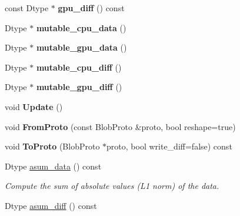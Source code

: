 \begin{DoxyCompactItemize}
\item 
const Dtype $\ast$ {\bfseries gpu\+\_\+diff} () const \hypertarget{classcaffe_1_1Blob_aafcc1d137ff67dea2d65824ce67bb21d}{}\label{classcaffe_1_1Blob_aafcc1d137ff67dea2d65824ce67bb21d}

\item 
Dtype $\ast$ {\bfseries mutable\+\_\+cpu\+\_\+data} ()\hypertarget{classcaffe_1_1Blob_ac170c040c34e2e78e7fc0d2ee12cf0ef}{}\label{classcaffe_1_1Blob_ac170c040c34e2e78e7fc0d2ee12cf0ef}

\item 
Dtype $\ast$ {\bfseries mutable\+\_\+gpu\+\_\+data} ()\hypertarget{classcaffe_1_1Blob_abac6bde0521e019df173213af6808e3b}{}\label{classcaffe_1_1Blob_abac6bde0521e019df173213af6808e3b}

\item 
Dtype $\ast$ {\bfseries mutable\+\_\+cpu\+\_\+diff} ()\hypertarget{classcaffe_1_1Blob_a4eb870499aa659a5eee7af622cd92eca}{}\label{classcaffe_1_1Blob_a4eb870499aa659a5eee7af622cd92eca}

\item 
Dtype $\ast$ {\bfseries mutable\+\_\+gpu\+\_\+diff} ()\hypertarget{classcaffe_1_1Blob_a8d230bed098a5ee31559df0b8e2db252}{}\label{classcaffe_1_1Blob_a8d230bed098a5ee31559df0b8e2db252}

\item 
void {\bfseries Update} ()\hypertarget{classcaffe_1_1Blob_afe035d7b60c56e4aed2a18296e8ffdc5}{}\label{classcaffe_1_1Blob_afe035d7b60c56e4aed2a18296e8ffdc5}

\item 
void {\bfseries From\+Proto} (const Blob\+Proto \&proto, bool reshape=true)\hypertarget{classcaffe_1_1Blob_a0a95f882414ba0a11d674b134478476d}{}\label{classcaffe_1_1Blob_a0a95f882414ba0a11d674b134478476d}

\item 
void {\bfseries To\+Proto} (Blob\+Proto $\ast$proto, bool write\+\_\+diff=false) const \hypertarget{classcaffe_1_1Blob_ad297f6b6cad67200c3b5201034653271}{}\label{classcaffe_1_1Blob_ad297f6b6cad67200c3b5201034653271}

\item 
Dtype \hyperlink{classcaffe_1_1Blob_a7ee118b64a34cdb1acb8533d9b68aa64}{asum\+\_\+data} () const \hypertarget{classcaffe_1_1Blob_a7ee118b64a34cdb1acb8533d9b68aa64}{}\label{classcaffe_1_1Blob_a7ee118b64a34cdb1acb8533d9b68aa64}

\begin{DoxyCompactList}\small\item\em Compute the sum of absolute values (L1 norm) of the data. \end{DoxyCompactList}\item 
Dtype \hyperlink{classcaffe_1_1Blob_a7305f3f0b0035d41c95462c0b2dc58c2}{asum\+\_\+diff} () const \hypertarget{classcaffe_1_1Blob_a7305f3f0b0035d41c95462c0b2dc58c2}{}\label{classcaffe_1_1Blob_a7305f3f0b0035d41c95462c0b2dc58c2}


\end{DoxyCompactItemize}
